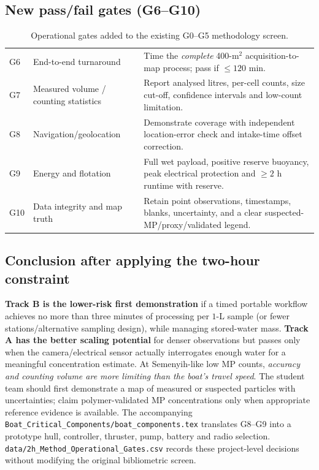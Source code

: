 \documentclass[10pt,a4paper]{article}
\begin{document}
\subsection{New pass/fail gates (G6--G10)}
\begin{table}[H]\centering\footnotesize
\caption{Operational gates added to the existing G0--G5 methodology screen.}\label{tab:extra-gates}
\begin{tabularx}{\linewidth}{@{}L{0.8cm}L{3.8cm}Y@{}}\toprule
G6 & End-to-end turnaround & Time the \emph{complete} 400-m$^2$ acquisition-to-map process; pass if $\leq120$ min.\\
G7 & Measured volume / counting statistics & Report analysed litres, per-cell counts, size cut-off, confidence intervals and low-count limitation.\\
G8 & Navigation/geolocation & Demonstrate coverage with independent location-error check and intake-time offset correction.\\
G9 & Energy and flotation & Full wet payload, positive reserve buoyancy, peak electrical protection and $\geq2$ h runtime with reserve.\\
G10 & Data integrity and map truth & Retain point observations, timestamps, blanks, uncertainty, and a clear suspected-MP/proxy/validated legend.\\\bottomrule
\end{tabularx}\end{table}

\subsection{Conclusion after applying the two-hour constraint}
\textbf{Track B is the lower-risk first demonstration} if a timed portable workflow achieves no more than three minutes of processing per $1$-L sample (or fewer stations/alternative sampling design), while managing stored-water mass. \textbf{Track A has the better scaling potential} for denser observations but passes only when the camera/electrical sensor actually interrogates enough water for a meaningful concentration estimate. At Semenyih-like low MP counts, \emph{accuracy and counting volume are more limiting than the boat's travel speed}. The student team should first demonstrate a map of measured or suspected particles with uncertainties; claim polymer-validated MP concentrations only when appropriate reference evidence is available. The accompanying \texttt{Boat\_Critical\_Components/boat\_components.tex} translates G8--G9 into a prototype hull, controller, thruster, pump, battery and radio selection. \texttt{data/2h\_Method\_Operational\_Gates.csv} records these project-level decisions without modifying the original bibliometric screen.
\end{document}

